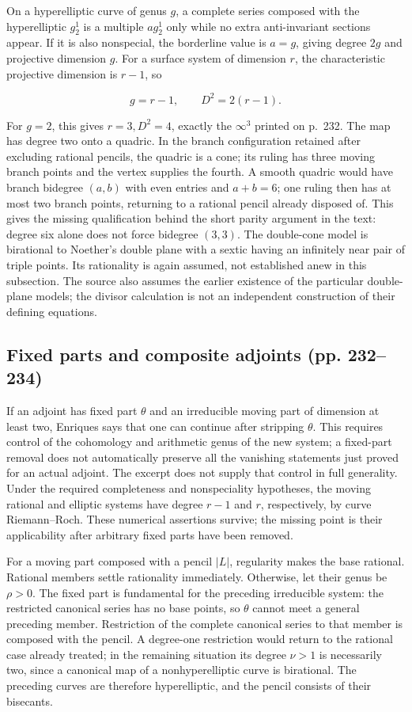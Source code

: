 On a hyperelliptic curve of genus \(g\), a complete series composed with the hyperelliptic \(g^1_2\) is a multiple \(a g^1_2\) only while no extra anti-invariant sections appear. If it is also nonspecial, the borderline value is \(a=g\), giving degree \(2g\) and projective dimension \(g\). For a surface system of dimension \(r\), the characteristic projective dimension is \(r-1\), so

\[
g=r-1,\qquad D^2=2(r-1).
\]

For \(g=2\), this gives \(r=3,D^2=4\), exactly the \(\infty^3\) printed on p.~232. The map has degree two onto a quadric. In the branch configuration retained after excluding rational pencils, the quadric is a cone; its ruling has three moving branch points and the vertex supplies the fourth. A smooth quadric would have branch bidegree \((a,b)\) with even entries and \(a+b=6\); one ruling then has at most two branch points, returning to a rational pencil already disposed of. This gives the missing qualification behind the short parity argument in the text: degree six alone does not force bidegree \((3,3)\). The double-cone model is birational to Noether's double plane with a sextic having an infinitely near pair of triple points. Its rationality is again assumed, not established anew in this subsection. The source also assumes the earlier existence of the particular double-plane models; the divisor calculation is not an independent construction of their defining equations.

\subsection{Fixed parts and composite adjoints (pp. 232–234)}

If an adjoint has fixed part \(\theta\) and an irreducible moving part of dimension at least two, Enriques says that one can continue after stripping \(\theta\). This requires control of the cohomology and arithmetic genus of the new system; a fixed-part removal does not automatically preserve all the vanishing statements just proved for an actual adjoint. The excerpt does not supply that control in full generality. Under the required completeness and nonspeciality hypotheses, the moving rational and elliptic systems have degree \(r-1\) and \(r\), respectively, by curve Riemann--Roch. These numerical assertions survive; the missing point is their applicability after arbitrary fixed parts have been removed.

For a moving part composed with a pencil \(|L|\), regularity makes the base rational. Rational members settle rationality immediately. Otherwise, let their genus be \(\rho>0\). The fixed part is fundamental for the preceding irreducible system: the restricted canonical series has no base points, so \(\theta\) cannot meet a general preceding member. Restriction of the complete canonical series to that member is composed with the pencil. A degree-one restriction would return to the rational case already treated; in the remaining situation its degree \(\nu>1\) is necessarily two, since a canonical map of a nonhyperelliptic curve is birational. The preceding curves are therefore hyperelliptic, and the pencil consists of their bisecants.

